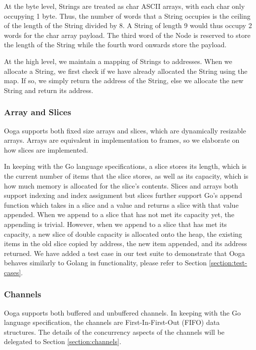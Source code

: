 \documentclass{report}
\begin{document}
At the byte level, Strings are treated as char ASCII arrays, with each char only occupying 1 byte. Thus, the number of words that a String occupies is the ceiling of the length of the String divided by 8. A String of length 9 would thus occupy 2 words for the char array payload. The third word of the Node is reserved to store the length of the String while the fourth word onwards store the payload.

At the high level, we maintain a mapping of Strings to addresses. When we allocate a String, we first check if we have already allocated the String using the map. If so, we simply return the address of the String, else we allocate the new String and return its address.

\subsubsection{Array and Slices}

Ooga supports both fixed size arrays and slices, which are dynamically resizable arrays. Arrays are equivalent in implementation to frames, so we elaborate on how slices are implemented.

In keeping with the Go language specifications, a slice stores its length, which is the current number of items that the slice stores, as well as its capacity, which is how much memory is allocated for the slice's contents. Slices and arrays both support indexing and index assignment but slices further support Go's append function which takes in a slice and a value and returns a slice with that value appended. When we append to a slice that has not met its capacity yet, the appending is trivial. However, when we append to a slice that has met its capacity, a new slice of double capacity is allocated onto the heap, the existing items in the old slice copied by address, the new item appended, and its address returned. We have added a test case in our test suite to demonstrate that Ooga behaves similarly to Golang in functionality, please refer to Section \ref{section:test-cases}.

\subsubsection{Channels}

Ooga supports both buffered and unbuffered channels. In keeping with the Go language specification, the channels are First-In-First-Out (FIFO) data structures. The details of the concurrency aspects of the channels will be delegated to Section \ref{section:channels}.
\end{document}
